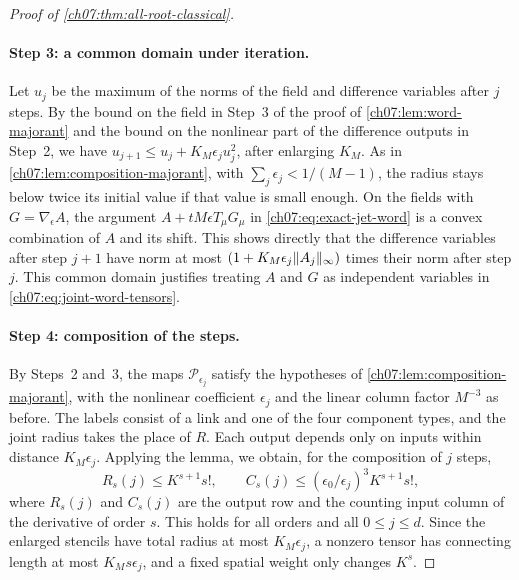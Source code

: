 \begin{proof}[Proof of \cref{ch07:thm:all-root-classical}]
\paragraph{Step 3: a common domain under iteration.}
Let $u_j$ be the maximum of the norms of the field and difference variables after $j$ steps. By the bound on the field in Step~3 of the proof of \cref{ch07:lem:word-majorant} and the bound on the nonlinear part of the difference outputs in Step~2, we have $u_{j+1}\le u_j+K_M\epsilon_ju_j^2$, after enlarging $K_M$. As in \cref{ch07:lem:composition-majorant}, with $\sum_j\epsilon_j<1/(M-1)$, the radius stays below twice its initial value if that value is small enough. On the fields with $G=\nabla_\epsilon A$, the argument $A+tM\epsilon T_\mu G_\mu$ in \eqref{ch07:eq:exact-jet-word} is a convex combination of $A$ and its shift. This shows directly that the difference variables after step $j+1$ have norm at most $(1+K_M\epsilon_j\lVert A_j\rVert_\infty)$ times their norm after step $j$. This common domain justifies treating $A$ and $G$ as independent variables in \eqref{ch07:eq:joint-word-tensors}.

\paragraph{Step 4: composition of the steps.}
By Steps~2 and~3, the maps $\mathcal P_{\epsilon_j}$ satisfy the hypotheses of \cref{ch07:lem:composition-majorant}, with the nonlinear coefficient $\epsilon_j$ and the linear column factor $M^{-3}$ as before. The labels consist of a link and one of the four component types, and the joint radius takes the place of $R$. Each output depends only on inputs within distance $K_M\epsilon_j$. Applying the lemma, we obtain, for the composition of $j$ steps,
\begin{equation}\label{ch07:eq:composed-joint-word}
 R_s(j)\le K^{s+1}s!,\qquad C_s(j)\le(\epsilon_0/\epsilon_j)^3K^{s+1}s!,
\end{equation}
where $R_s(j)$ and $C_s(j)$ are the output row and the counting input column of the derivative of order $s$. This holds for all orders and all $0\le j\le d$. Since the enlarged stencils have total radius at most $K_M\epsilon_j$, a nonzero tensor has connecting length at most $K_Ms\epsilon_j$, and a fixed spatial weight only changes $K^s$.


\end{proof}

